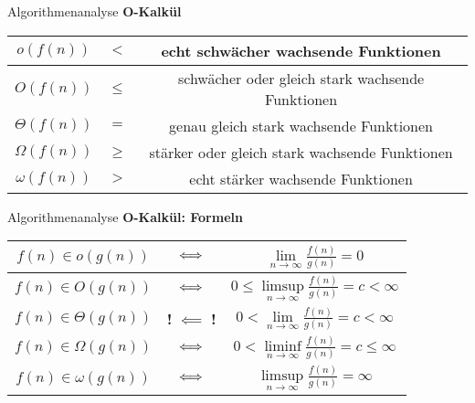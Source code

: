 \begin{frame}{Algorithmenanalyse}
	\textbf{O-Kalkül} \\
	{
		\renewcommand{\arraystretch}{2}%
	
		\begin{center}
			\begin{tabular}{ | c | c | c | }
				\hline
				$     o (f(n))$ & $<$ & echt schwächer wachsende Funktionen
				\\ \hline
				$     O (f(n))$ & $\leq$ & schwächer oder gleich stark wachsende Funktionen
				\\ \hline
				$\Theta (f(n))$ & $=$ & genau gleich stark wachsende Funktionen
				\\ \hline
				$\Omega (f(n))$ & $\geq$ & stärker oder gleich stark wachsende Funktionen
				\\ \hline
				$\omega (f(n))$ & $>$ & echt stärker wachsende Funktionen
				\\ \hline
			\end{tabular}
		\end{center}
	}
\end{frame}

\begin{frame}{Algorithmenanalyse}
	\textbf{O-Kalkül: Formeln} \\
	{
		\renewcommand{\arraystretch}{2}%
		\begin{center}
			\begin{tabular}{ | c | c | >{\quad}c<{\quad} | }
				\hline
				$f(n) \in o      (g(n))$ & $\Gdw$ & \(\lim\limits_{n \to \infty} \frac{f(n)}{g(n)} = 0\) 
				\\  \hline
				$f(n) \in O      (g(n))$ & $\Gdw$ & \(0 \leq \limsup\limits_{n \to \infty} \frac{f(n)}{g(n)} = c < \infty\)
				\\ \hline
				$f(n) \in \Theta (g(n))$ & \cellcolor{adaptingred} {\textbf{!} $\bm{\impliedby}$ \textbf{!}} & \(0 < \lim\limits_{n \to \infty} \frac{f(n)}{g(n)} = c < \infty\)
				\\ \hline
				$f(n) \in \Omega (g(n))$ & $\Gdw$ & \(0 < \liminf\limits_{n \to \infty} \frac{f(n)}{g(n)} = c \leq \infty\)
				\\ \hline
				$f(n) \in \omega (g(n))$ & $\Gdw$ & \(\limsup\limits_{n \to \infty} \frac{f(n)}{g(n)} = \infty\)
				\\ \hline
			\end{tabular}
		\end{center}
	}
\end{frame}

